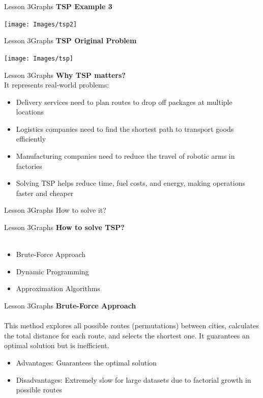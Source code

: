 \documentclass[aspectratio=1610]{beamer}
\begin{document}
\begin{frame}{Lesson 3}{Graphs}
\LARGE
\textbf{TSP Example 3}
\begin{center}
\texttt{[image: Images/tsp2]}
\end{center}
\end{frame}


\begin{frame}{Lesson 3}{Graphs}
\LARGE
\textbf{TSP Original Problem}\\
\begin{center}
\texttt{[image: Images/tsp]}
\end{center}
\end{frame}


\begin{frame}{Lesson 3}{Graphs}
\LARGE
\textbf{Why TSP matters?}\\
\Large
It represents real-world problems:
\begin{itemize}
    \item Delivery services need to plan routes to drop off packages at multiple locations
    \item Logistics companies need to find the shortest path to transport goods efficiently
    \item Manufacturing companies need to reduce the travel of robotic arms in factories
    \item Solving TSP helps reduce time, fuel costs, and energy, making operations faster and cheaper
\end{itemize}
\end{frame}


\begin{frame}{Lesson 3}{Graphs}
\Huge
How to solve it?
\end{frame}


\begin{frame}{Lesson 3}{Graphs}
\LARGE
\textbf{How to solve TSP?}\\~\\
\Large
\begin{itemize}
	\item Brute-Force Approach
	\item Dynamic Programming
	\item Approximation Algorithms
\end{itemize}
\end{frame}



\begin{frame}{Lesson 3}{Graphs}
\LARGE
\textbf{Brute-Force Approach}\\~\\
\Large
This method explores all possible routes (permutations) between
cities, calculates the total distance for each route, and selects
the shortest one. It guarantees an optimal solution but is
inefficient.
\begin{itemize}
	\item Advantages: Guarantees the optimal solution
	\item Disadvantages: Extremely slow for large datasets due to factorial growth in possible routes
\end{itemize}
\end{frame}
\end{document}
